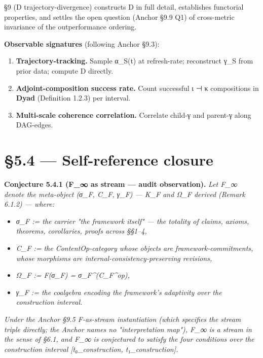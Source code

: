 \documentclass[11pt, openany]{book}
\newcommand{\sectionbreak}{\clearpage}
\begin{document}
§9 (D trajectory-divergence) constructs D in full detail, establishes functorial properties, and settles the open question (Anchor §9.9 Q1) of cross-metric invariance of the outperformance ordering.

\textbf{Observable signatures} (following Anchor §9.3):

\begin{enumerate}
\item \textbf{Trajectory-tracking.} Sample α\_\allowbreak{}S(t) at refresh-rate; reconstruct γ\_\allowbreak{}S from prior data; compute D directly.
\item \textbf{Adjoint-composition success rate.} Count successful ι ⊣ κ compositions in \textbf{Dyad} (Definition 1.2.3) per interval.
\item \textbf{Multi-scale coherence correlation.} Correlate child-γ and parent-γ along DAG-edges.
\end{enumerate}

\sectionbreak

\section{§5.4 --- Self-reference closure}

\textbf{Conjecture 5.4.1 (F\_\allowbreak{}∞ as stream --- audit observation).} \textit{Let F\_\allowbreak{}∞ denote the meta-object (σ\_\allowbreak{}F, C\_\allowbreak{}F, γ\_\allowbreak{}F) --- K\_\allowbreak{}F and Ω\_\allowbreak{}F derived (Remark 6.1.2) --- where:}

\begin{itemize}
\item \textit{σ\_\allowbreak{}F := the carrier "the framework itself" --- the totality of claims, axioms, theorems, corollaries, proofs across §§1–4,}
\item \textit{C\_\allowbreak{}F := the ContentOp-category whose objects are framework-commitments, whose morphisms are internal-consistency-preserving revisions,}
\item \textit{Ω\_\allowbreak{}F := F(σ\_\allowbreak{}F) = σ\_\allowbreak{}F\textasciicircum{}(C\_\allowbreak{}F\textasciicircum{}op),}
\item \textit{γ\_\allowbreak{}F := the coalgebra encoding the framework's adaptivity over the construction interval.}
\end{itemize}

\textit{Under the Anchor §9.5 F-as-stream instantiation (which specifies the stream triple directly; the Anchor names no "interpretation map"), F\_\allowbreak{}∞ is a stream in the sense of §6.1, and F\_\allowbreak{}∞ is conjectured to satisfy the four conditions over the construction interval [t₀\_\allowbreak{}construction, t₁\_\allowbreak{}construction].}
\end{document}
